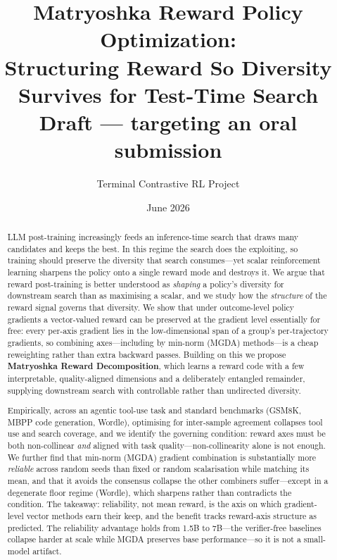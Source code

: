 \documentclass[11pt,a4paper]{article}
\title{Matryoshka Reward Policy Optimization:\\
Structuring Reward So Diversity Survives for Test-Time Search\\[6pt]
{\large Draft --- targeting an oral submission}}
\author{Terminal Contrastive RL Project}
\date{June 2026}
\begin{document}
\maketitle

\begin{abstract}
LLM post-training increasingly feeds an inference-time search that draws many
candidates and keeps the best.  In this regime the search does the exploiting,
so training should preserve the diversity that search consumes---yet scalar
reinforcement learning sharpens the policy onto a single reward mode and
destroys it.  We argue that reward post-training is better understood as
\emph{shaping} a policy's diversity for downstream search than as maximising a
scalar, and we study how the \emph{structure} of the reward signal governs that
diversity.  We show that under outcome-level policy gradients a vector-valued
reward can be preserved at the gradient level essentially for free: every
per-axis gradient lies in the low-dimensional span of a group's per-trajectory
gradients, so combining axes---including by min-norm (MGDA) methods---is a cheap
reweighting rather than extra backward passes.  Building on this we propose
\textbf{Matryoshka Reward Decomposition}, which learns a reward code with a few
interpretable, quality-aligned dimensions and a deliberately entangled
remainder, supplying downstream search with controllable rather than undirected
diversity.

Empirically, across an agentic tool-use task and standard benchmarks (GSM8K,
MBPP code generation, Wordle), optimising for inter-sample agreement collapses
tool use and search coverage, and we identify the governing condition: reward
axes must be both non-collinear \emph{and} aligned with task
quality---non-collinearity alone is not enough.  We further find that min-norm
(MGDA) gradient combination is substantially more \emph{reliable} across random
seeds than fixed or random scalarisation while matching its mean, and that it
avoids the consensus collapse the other combiners suffer---except in a
degenerate floor regime (Wordle), which sharpens rather than contradicts the
condition.  The takeaway: reliability, not mean reward, is the axis on which
gradient-level vector methods earn their keep, and the benefit tracks reward-axis
structure as predicted.  The reliability advantage holds from 1.5B to 7B---the
verifier-free baselines collapse harder at scale while MGDA preserves base
performance---so it is not a small-model artifact.
\end{abstract}
\end{document}
